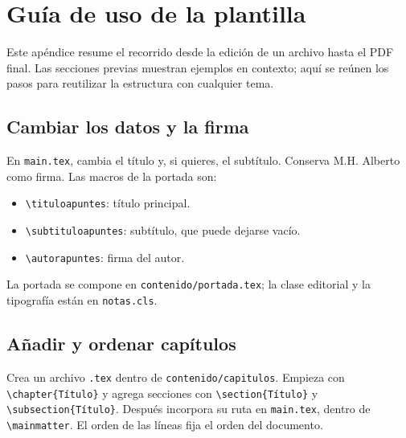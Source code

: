 \chapter{Guía de uso de la plantilla}
\label{ap:guia-uso}

Este apéndice resume el recorrido desde la edición de un archivo hasta el PDF final. Las secciones previas muestran ejemplos en contexto; aquí se reúnen los pasos para reutilizar la estructura con cualquier tema.

\section{Cambiar los datos y la firma}

En \texttt{main.tex}, cambia el título y, si quieres, el subtítulo. Conserva M.H. Alberto como firma. Las macros de la portada son:

\begin{itemize}
  \item \verb|\tituloapuntes|: título principal.
  \item \verb|\subtituloapuntes|: subtítulo, que puede dejarse vacío.
  \item \verb|\autorapuntes|: firma del autor.
\end{itemize}

La portada se compone en \texttt{contenido/portada.tex}; la clase editorial y la tipografía están en \texttt{notas.cls}.

\section{Añadir y ordenar capítulos}

Crea un archivo \texttt{.tex} dentro de \texttt{contenido/capitulos}. Empieza con \verb|\chapter{Título}| y agrega secciones con \verb|\section{Título}| y \verb|\subsection{Título}|. Después incorpora su ruta en \texttt{main.tex}, dentro de \verb|\mainmatter|. El orden de las líneas \verb|| fija el orden del documento.

